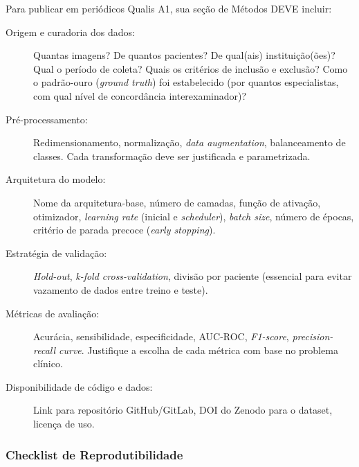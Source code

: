 
Para publicar em periódicos Qualis A1, sua seção de Métodos DEVE incluir:

\begin{description}
  \item[Origem e curadoria dos dados:] Quantas imagens? De quantos pacientes?
    De qual(ais) instituição(ões)? Qual o período de coleta? Quais os critérios
    de inclusão e exclusão? Como o padrão-ouro (\textit{ground truth}) foi
    estabelecido (por quantos especialistas, com qual nível de concordância
    interexaminador)?

  \item[Pré-processamento:] Redimensionamento, normalização, \textit{data
    augmentation}, balanceamento de classes. Cada transformação deve ser
    justificada e parametrizada.

  \item[Arquitetura do modelo:] Nome da arquitetura-base, número de camadas,
    função de ativação, otimizador, \textit{learning rate} (inicial e
    \textit{scheduler}), \textit{batch size}, número de épocas, critério de
    parada precoce (\textit{early stopping}).

  \item[Estratégia de validação:] \textit{Hold-out}, \textit{k-fold
    cross-validation}, divisão por paciente (essencial para evitar vazamento de
    dados entre treino e teste).

  \item[Métricas de avaliação:] Acurácia, sensibilidade, especificidade, AUC-ROC,
    \textit{F1-score}, \textit{precision-recall curve}. Justifique a escolha de
    cada métrica com base no problema clínico.

  \item[Disponibilidade de código e dados:] Link para repositório GitHub/GitLab,
    DOI do Zenodo para o dataset, licença de uso.
\end{description}

\subsubsection{Checklist de Reprodutibilidade}

